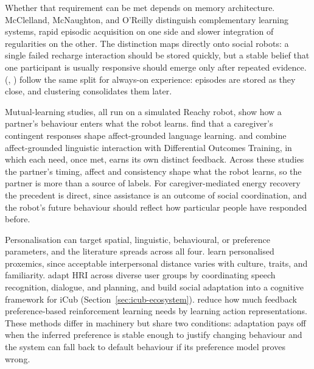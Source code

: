 Whether that requirement can be met depends on memory architecture. McClelland, McNaughton, and O'Reilly \citeyearpar{McClelland1995ComplementaryLearning} distinguish complementary learning systems, rapid episodic acquisition on one side and slower integration of regularities on the other. The distinction maps directly onto social robots: a single failed recharge interaction should be stored quickly, but a stable belief that one participant is usually responsive should emerge only after repeated evidence. \citeauthor{Pasquali2024ArtificialCognition} (\citeyear{Pasquali2024ArtificialCognition}, \citeyear{Pasquali2025AlwaysOn}) follow the same split for always-on experience: episodes are stored as they close, and clustering consolidates them later.

Mutual-learning studies, all run on a simulated Reachy robot, show how a partner's behaviour enters what the robot learns. \citet{Lemhaouri2022CaregiverResponsiveness} find that a caregiver's contingent responses shape affect-grounded language learning. \citet{Markelius2023MutualLearning} and \citet{Heikkinen2024MutualLearning} combine affect-grounded linguistic interaction with Differential Outcomes Training, in which each need, once met, earns its own distinct feedback. Across these studies the partner's timing, affect and consistency shape what the robot learns, so the partner is more than a source of labels. For caregiver-mediated energy recovery the precedent is direct, since assistance is an outcome of social coordination, and the robot's future behaviour should reflect how particular people have responded before.

Personalisation can target spatial, linguistic, behavioural, or preference parameters, and the literature spreads across all four. \citet{Patompak2020Proxemics} learn personalised proxemics, since acceptable interpersonal distance varies with culture, traits, and familiarity. \citet{PekarekRosin2025DiverseUsers} adapt HRI across diverse user groups by coordinating speech recognition, dialogue, and planning, and \citet{Tanevska2020SociallyAdaptable} build social adaptation into a cognitive framework for iCub (Section~\ref{sec:icub-ecosystem}). \citet{Wang2025PreferenceAction} reduce how much feedback preference-based reinforcement learning needs by learning action representations. These methods differ in machinery but share two conditions: adaptation pays off when the inferred preference is stable enough to justify changing behaviour and the system can fall back to default behaviour if its preference model proves wrong.

